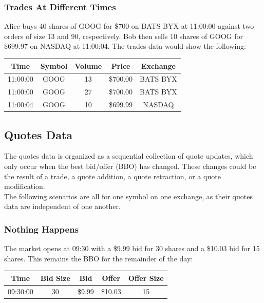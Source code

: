\documentclass{article}
\begin{document}
\subsubsection{Trades At Different Times}
Alice buys 40 shares of GOOG for \$700 on BATS BYX at 11:00:00 against two orders of size 13 and 90, respectively. Bob then sells 10 shares of GOOG for \$699.97 on NASDAQ at 11:00:04. The trades data would show the following:
\begin{center}
  \begin{tabular}{| c | c | c | c | c |}
    \hline
    Time & Symbol & Volume & Price & Exchange \\ \hline
    11:00:00 & GOOG & 13 & \$700.00 & BATS BYX \\ \hline
    11:00:00 & GOOG & 27 & \$700.00 & BATS BYX \\ \hline
    11:00:04 & GOOG & 10 & \$699.99 & NASDAQ \\ 
    \hline
  \end{tabular}
\end{center}

\subsection{Quotes Data}
The quotes data is organized as a sequential collection of quote updates, which only occur when the best bid/offer (BBO) has changed. These changes could be the result of a trade, a quote addition, a quote retraction, or a quote modification.\\
The following scenarios are all for one symbol on one exchange, as their quotes data are independent of one another.\\

\subsubsection{Nothing Happens}
The market opens at 09:30 with a \$9.99 bid for 30 shares and a \$10.03 bid for 15 shares. This remains the BBO for the remainder of the day:
\begin{center}
  \begin{tabular}{| c | c | c | c | c |}
    \hline
    Time & Bid Size & Bid & Offer & Offer Size \\ \hline
    09:30:00 & 30 & \$9.99 & \$10.03 & 15 \\
    \hline
  \end{tabular}
\end{center}
\end{document}

